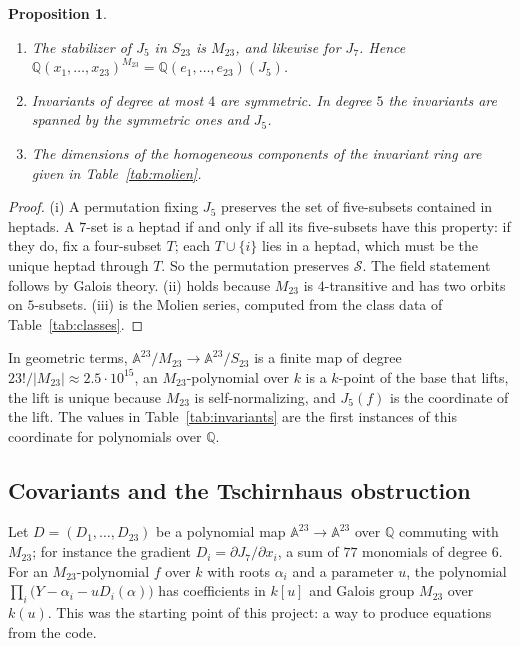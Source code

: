 \documentclass[11pt]{amsart}
\newtheorem{proposition}[theorem]{Proposition}
\theoremstyle{definition}
\newcommand{\QQ}{\mathbb{Q}}
\newcommand{\M}{M_{23}}
\newcommand{\cS}{\mathcal{S}}
\begin{document}
\begin{proposition}\label{prop:J5}
\begin{enumerate}[label=\textup{(\roman*)}]
\item The stabilizer of $J_5$ in $S_{23}$ is $\M$, and likewise for $J_7$. Hence $\QQ(x_1,\dots,x_{23})^{\M}=\QQ(e_1,\dots,e_{23})(J_5)$.
\item Invariants of degree at most $4$ are symmetric. In degree $5$ the invariants are spanned by the symmetric ones and $J_5$.
\item The dimensions of the homogeneous components of the invariant ring are given in Table~\ref{tab:molien}.
\end{enumerate}
\end{proposition}
\begin{proof}
(i) A permutation fixing $J_5$ preserves the set of five-subsets contained in heptads. A $7$-set is a heptad if and only if all its five-subsets have this property: if they do, fix a four-subset $T$; each $T\cup\{i\}$ lies in a heptad, which must be the unique heptad through $T$. So the permutation preserves $\cS$. The field statement follows by Galois theory. (ii) holds because $\M$ is $4$-transitive and has two orbits on $5$-subsets. (iii) is the Molien series, computed from the class data of Table~\ref{tab:classes}.
\end{proof}



In geometric terms, $\mathbb A^{23}/\M\to\mathbb A^{23}/S_{23}$ is a finite map of degree $23!/|\M|\approx2.5\cdot10^{15}$, an $\M$-polynomial over $k$ is a $k$-point of the base that lifts, the lift is unique because $\M$ is self-normalizing, and $J_5(f)$ is the coordinate of the lift. The values in Table~\ref{tab:invariants} are the first instances of this coordinate for polynomials over $\QQ$.

\subsection{Covariants and the Tschirnhaus obstruction}
Let $D=(D_1,\dots,D_{23})$ be a polynomial map $\mathbb A^{23}\to\mathbb A^{23}$ over $\QQ$ commuting with $\M$; for instance the gradient $D_i=\partial J_7/\partial x_i$, a sum of $77$ monomials of degree $6$. For an $\M$-polynomial $f$ over $k$ with roots $\alpha_i$ and a parameter $u$, the polynomial $\prod_i\bigl(Y-\alpha_i-uD_i(\alpha)\bigr)$ has coefficients in $k[u]$ and Galois group $\M$ over $k(u)$. This was the starting point of this project: a way to produce equations from the code.
\end{document}
